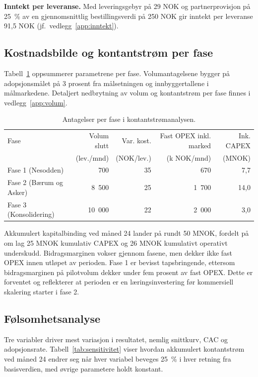 \textbf{Inntekt per leveranse.} Med leveringsgebyr på 29 NOK og
partnerprovisjon på 25~\% av en gjennomsnittlig bestillingsverdi på
250 NOK gir inntekt per leveranse 91{,}5 NOK
(jf.\ vedlegg~\ref{app:inntekt}).

\subsection{Kostnadsbilde og kontantstrøm per fase}

Tabell~\ref{tab:fasekostnader} oppsummerer parametrene per fase.
Volumantagelsene bygger på adopsjonsmålet på 3 prosent fra målsetningen
og innbyggertallene i målmarkedene. Detaljert nedbrytning av volum og
kontantstrøm per fase finnes i vedlegg~\ref{app:volum}.

\begin{table}[h]
\centering
\caption{Antagelser per fase i kontantstrømanalysen.}
\label{tab:fasekostnader}
\small
\begin{tabular}{lrrrr}
\hline
Fase & Volum slutt & Var. kost. & Fast OPEX inkl. marked & Ink. CAPEX \\
 & (lev./mnd) & (NOK/lev.) & (k NOK/mnd) & (MNOK) \\
\hline
Fase 1 (Nesodden) & 700 & 35 & 670 & 7{,}7 \\
Fase 2 (Bærum og Asker) & 8~500 & 25 & 1~700 & 14{,}0 \\
Fase 3 (Konsolidering) & 10~000 & 22 & 2~000 & 3{,}0 \\
\hline
\end{tabular}
\end{table}

Akkumulert kapitalbinding ved måned 24 lander på rundt 50 MNOK,
fordelt på om lag 25 MNOK kumulativ CAPEX og 26 MNOK kumulativt
operativt underskudd. Bidragsmarginen vokser gjennom fasene, men dekker
ikke fast OPEX innen utløpet av perioden. Fase 1 er bevisst
tapsbringende, ettersom bidragsmarginen på pilotvolum dekker under fem
prosent av fast OPEX. Dette er forventet og reflekterer at perioden er
en lærings\-investering før kommersiell skalering starter i fase 2.

\subsection{Følsomhetsanalyse}

Tre variabler driver mest variasjon i resultatet, nemlig snittkurv,
CAC og adopsjonsrate. Tabell~\ref{tab:sensitivitet} viser hvordan
akkumulert kontantstrøm ved måned 24 endrer seg når hver variabel
beveges 25~\% i hver retning fra basisverdien, med øvrige parametere
holdt konstant.

